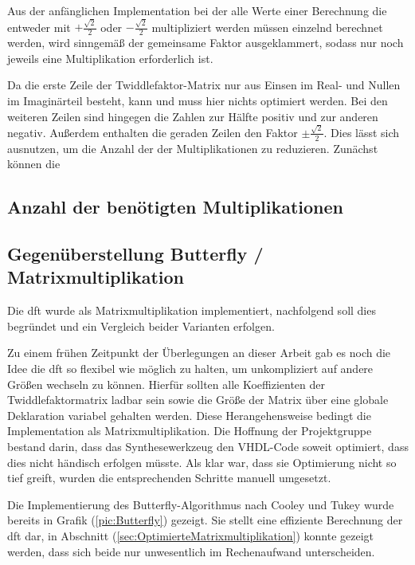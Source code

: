 Aus der anfänglichen Implementation bei der alle Werte einer Berechnung die entweder mit $+\frac{\sqrt{2}}{2}$ oder $-\frac{\sqrt{2}}{2}$ multipliziert werden müssen 
einzelnd berechnet werden, wird sinngemäß der gemeinsame Faktor ausgeklammert, sodass nur noch jeweils eine Multiplikation erforderlich ist.

Da die erste Zeile der Twiddlefaktor-Matrix nur aus Einsen im Real- und Nullen im Imaginärteil besteht, kann und muss hier nichts optimiert werden. 
Bei den weiteren Zeilen sind hingegen die Zahlen zur Hälfte positiv und zur anderen negativ. Außerdem enthalten die geraden Zeilen den Faktor $\pm\frac{\sqrt{2}}{2}$. 
Dies lässt sich ausnutzen, um die Anzahl der der Multiplikationen zu reduzieren. Zunächst können die 





\subsection{Anzahl der benötigten Multiplikationen}



\subsection{Gegenüberstellung Butterfly / Matrixmultiplikation} 
Die \gls{dft} wurde als Matrixmultiplikation implementiert, nachfolgend soll dies begründet und ein Vergleich beider Varianten erfolgen.
  
Zu einem frühen Zeitpunkt der Überlegungen 
an dieser Arbeit gab es noch die Idee die \gls{dft} so flexibel wie möglich zu halten, um unkompliziert auf andere Größen wechseln zu können.
Hierfür sollten alle Koeffizienten der Twiddlefaktormatrix ladbar sein sowie die Größe der Matrix über eine globale Deklaration variabel gehalten werden.
Diese Herangehensweise bedingt die Implementation als Matrixmultiplikation. Die Hoffnung der Projektgruppe bestand darin, dass das Synthesewerkzeug den 
VHDL-Code soweit optimiert, dass dies nicht händisch erfolgen müsste.
Als klar war, dass sie Optimierung nicht so tief greift, wurden die entsprechenden Schritte manuell umgesetzt. 
  
Die Implementierung des Butterfly-Algorithmus nach Cooley und Tukey wurde bereits in Grafik (\ref{pic:Butterfly}) gezeigt. Sie stellt eine effiziente Berechnung der \gls{dft} dar, in 
Abschnitt (\ref{sec:OptimierteMatrixmultiplikation}) konnte gezeigt werden, dass sich beide nur unwesentlich im Rechenaufwand unterscheiden.



